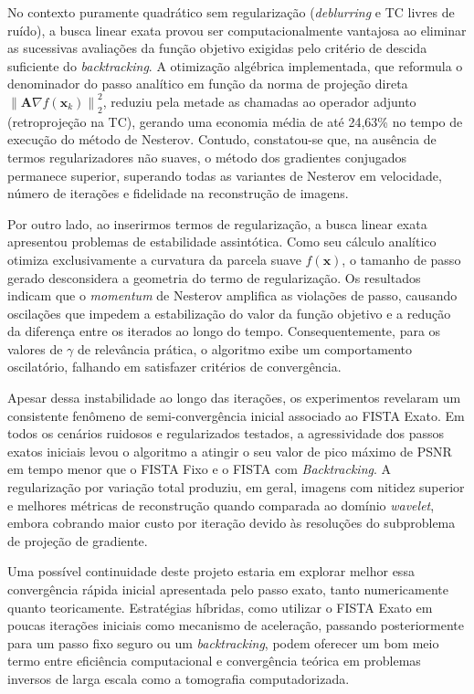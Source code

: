 \documentclass[12pt]{article}
\newcommand{\norm}[1]{\left\lVert#1\right\rVert}
\begin{document}
No contexto puramente quadrático sem regularização (\textit{deblurring} e TC livres de ruído), a busca linear exata provou ser computacionalmente vantajosa ao eliminar as sucessivas avaliações da função objetivo exigidas pelo critério de descida suficiente do \textit{backtracking}. A otimização algébrica implementada, que reformula o denominador do passo analítico em função da norma de projeção direta $\norm{\mathbf{A}\nabla f(\mathbf{x}_k)}_2^2$, reduziu pela metade as chamadas ao operador adjunto (retroprojeção na TC), gerando uma economia média de até 24,63\% no tempo de execução do método de Nesterov. Contudo, constatou-se que, na ausência de termos regularizadores não suaves, o método dos gradientes conjugados permanece superior, superando todas as variantes de Nesterov em velocidade, número de iterações e fidelidade na reconstrução de imagens.

Por outro lado, ao inserirmos termos de regularização, a busca linear exata apresentou problemas de estabilidade assintótica. Como seu cálculo analítico otimiza exclusivamente a curvatura da parcela suave $f(\mathbf{x})$, o tamanho de passo gerado desconsidera a geometria do termo de regularização. Os resultados indicam que o \textit{momentum} de Nesterov amplifica as violações de passo, causando oscilações que impedem a estabilização do valor da função objetivo e a redução da diferença entre os iterados ao longo do tempo. Consequentemente, para os valores de $\gamma$ de relevância prática, o algoritmo exibe um comportamento oscilatório, falhando em satisfazer critérios de convergência. 

Apesar dessa instabilidade ao longo das iterações, os experimentos revelaram um consistente fenômeno de semi-convergência inicial associado ao FISTA Exato. Em todos os cenários ruidosos e regularizados testados, a agressividade dos passos exatos iniciais levou o algoritmo a atingir o seu valor de pico máximo de PSNR em tempo menor que o FISTA Fixo e o FISTA com \textit{Backtracking}. A regularização por variação total produziu, em geral, imagens com nitidez superior e melhores métricas de reconstrução quando comparada ao domínio \textit{wavelet}, embora cobrando maior custo por iteração devido às resoluções do subproblema de projeção de gradiente.

Uma possível continuidade deste projeto estaria em explorar melhor essa convergência rápida inicial apresentada pelo passo exato, tanto numericamente quanto teoricamente. Estratégias híbridas, como utilizar o FISTA Exato em poucas iterações iniciais como mecanismo de aceleração, passando posteriormente para um passo fixo seguro ou um \textit{backtracking}, podem oferecer um bom meio termo entre eficiência computacional e convergência teórica em problemas inversos de larga escala como a tomografia computadorizada.
\end{document}
